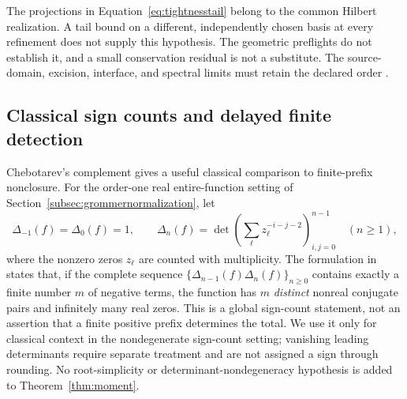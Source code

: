 \documentclass[11pt,letterpaper]{article}
\numberwithin{equation}{section}
\theoremstyle{definition}
\theoremstyle{remark}
\begin{document}
The projections in Equation~\eqref{eq:tightnesstail} belong to the common Hilbert realization. A tail bound on a different, independently chosen basis at every refinement does not supply this hypothesis. The geometric preflights do not establish it, and a small conservation residual is not a substitute. The source-domain, excision, interface, and spectral limits must retain the declared order \cite{tcgsconservative,tcgsfoam}.

\subsection{Classical sign counts and delayed finite detection}
\label{subsec:chebotarev}
Chebotarev's complement gives a useful classical comparison to finite-prefix nonclosure. For the order-one real entire-function setting of Section~\ref{subsec:grommernormalization}, let
\begin{equation}
 \Delta_{-1}(f)=\Delta_0(f)=1,\qquad
 \Delta_n(f)=\det\left(\sum_\ell z_\ell^{-i-j-2}\right)_{i,j=0}^{n-1}
 \quad(n\geq1),
 \label{eq:chebotarevsequence}
\end{equation}
where the nonzero zeros $z_\ell$ are counted with multiplicity. The formulation in \cite[Theorem~10(ii)]{bariczstampach} states that, if the complete sequence
$\{\Delta_{n-1}(f)\Delta_n(f)\}_{n\geq0}$ contains exactly a finite number $m$ of negative terms, the function has $m$ \emph{distinct} nonreal conjugate pairs and infinitely many real zeros. This is a global sign-count statement, not an assertion that a finite positive prefix determines the total. We use it only for classical context in the nondegenerate sign-count setting; vanishing leading determinants require separate treatment and are not assigned a sign through rounding. No root-simplicity or determinant-nondegeneracy hypothesis is added to Theorem~\ref{thm:moment}.
\end{document}
